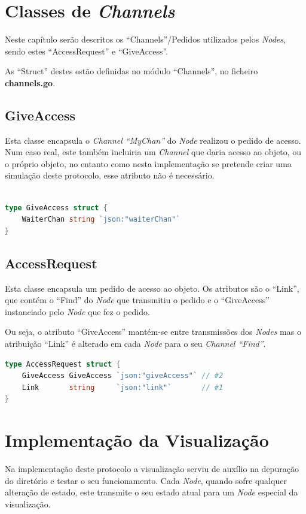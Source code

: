 \section{Classes de \emph{Channels}}
Neste capítulo serão descritos os ``Channels''/Pedidos utilizados pelos \emph{Nodes}, sendo estes ``AccessRequest'' e ``GiveAccess''.

As ``Struct'' destes estão definidas no módulo ``Channels'', no ficheiro \textbf{channels.go}.


\subsection*{GiveAccess}
Esta classe encapsula o \emph{Channel ``MyChan''} do \emph{Node} realizou o pedido de acesso.
Num caso real, este também incluiria um \emph{Channel} que daria acesso ao objeto, ou o próprio objeto, no entanto
como nesta implementação se pretende criar uma simulação deste protocolo, esse atributo não é necessário.

\begin{lstlisting}[caption={\emph{Struct} ``GiveAccess''},language=Go]

type GiveAccess struct {
	WaiterChan string `json:"waiterChan"`
}

\end{lstlisting}


\subsection*{AccessRequest}
Esta classe encapsula um pedido de acesso ao objeto. Os atributos são o ``Link'', que contém o ``Find'' do \emph{Node} que transmitiu o pedido e 
o ``GiveAccess'' instanciado pelo \emph{Node} que fez o pedido.

Ou seja, o atributo ``GiveAccess'' mantém-se entre transmissões dos \emph{Nodes} mas o atribuição ``Link'' é alterado em cada \emph{Node} para o 
seu \emph{Channel ``Find''}.

\begin{lstlisting}[caption={\emph{Struct} ``GiveAccess''},language=Go]
type AccessRequest struct {
	GiveAccess GiveAccess `json:"giveAccess"` // #2
	Link       string     `json:"link"`       // #1
}
\end{lstlisting}




\section{Implementação da Visualização}
Na implementação deste protocolo a visualização serviu de auxílio na depuração do diretório e testar o seu funcionamento.
Cada \emph{Node}, quando sofre qualquer alteração de estado, este transmite o seu estado atual para um \emph{Node} especial da visualização.

